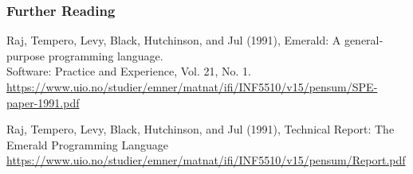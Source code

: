 \begin{frame}

\frametitle{Further Reading}

\begin{thebibliography}{Dijkstra, 1982}

 Raj, Tempero, Levy, Black,
Hutchinson, and Jul (1991), Emerald: A general‐purpose programming
language.\\ Software: Practice and Experience, Vol. 21, No.  1.\\
{\tiny
\url{https://www.uio.no/studier/emner/matnat/ifi/INF5510/v15/pensum/SPE-paper-1991.pdf}}

 Raj, Tempero, Levy, Black,
Hutchinson, and Jul (1991), Technical Report: The Emerald Programming
Language\\ {\tiny
\url{https://www.uio.no/studier/emner/matnat/ifi/INF5510/v15/pensum/Report.pdf}}

\end{thebibliography}
\end{frame}
